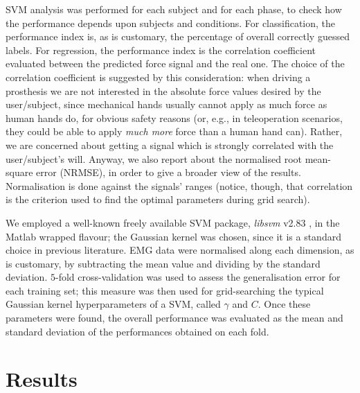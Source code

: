 \documentclass[10pt]{bmc_article}
\def\texttt{[image: ]}
\newenvironment{bmcformat}
  {\begin{raggedright}\baselineskip20pt\sloppy\setboolean{publ}{false}}
  {\end{raggedright}\baselineskip20pt\sloppy}
\begin{document}
\begin{bmcformat}
SVM analysis was performed for each subject and for each phase,
to check how the performance depends upon subjects and conditions.
For classification, the performance index is, as is
customary, the percentage of overall correctly guessed labels. For
regression, the performance index is the correlation coefficient
evaluated between the predicted force signal and the real one. The choice
of the correlation coefficient is suggested by this consideration:
when driving a prosthesis we are
not interested in the absolute force values desired by the
user/subject, since mechanical hands usually cannot apply as much
force as human hands do, for obvious safety reasons (or, e.g.,
in teleoperation scenarios, they could be able to apply \emph{much
more} force than a human hand can). Rather, we are concerned about
getting a signal which is strongly correlated with the user/subject's will.
Anyway, we also report about the normalised root mean-square error (NRMSE),
in order to give a broader view of the results. Normalisation is done against the
signals' ranges (notice, though, that correlation is the criterion used to
find the optimal parameters during grid search).

We employed a well-known freely available SVM package, \emph{libsvm}
v2.83 \cite{ChangL01}, in the Matlab wrapped flavour; the Gaussian kernel
was chosen, since it is a standard choice in previous literature.
EMG data were normalised along each dimension, as is customary, by subtracting
the mean value and dividing by the standard deviation. $5$-fold cross-validation was
used to assess the generalisation error for each training set; this measure
was then used for grid-searching the typical Gaussian kernel hyperparameters
of a SVM, called $\gamma$ and $C$. Once these parameters were found, the overall
performance was evaluated as the mean and standard deviation of the performances
obtained on each fold.



\section*{Results}
\label{sec:exp}


\end{bmcformat}
\end{document}
